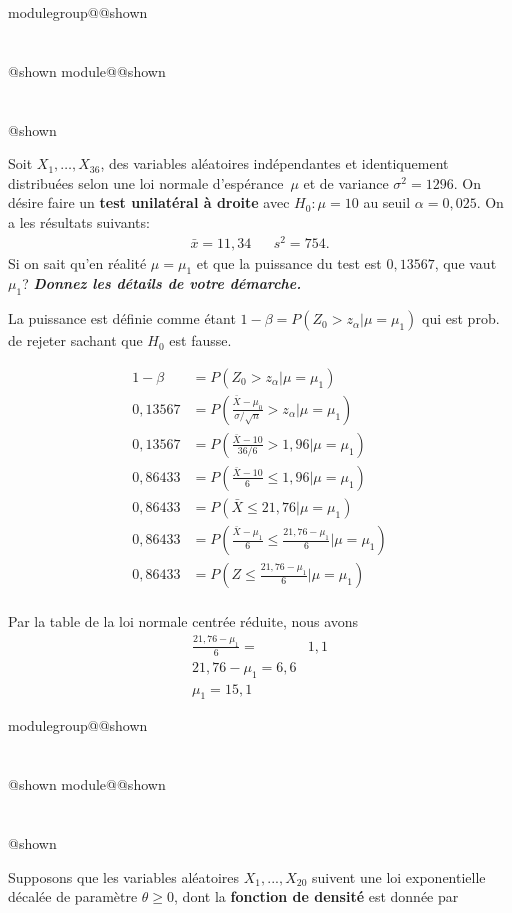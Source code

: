 \documentclass{Evaluation}
\makeatletter
\newcommand{\currentmodulekey}{}
\newcommand{\currentmoduletitle}{}
\newcommand{\currentgroupkey}{}
\newcommand{\currentgrouptitle}{}
\newcommand{\showmoduleifneeded}{%
  \ifx\currentgroupkey\empty\else
    \expandafter\ifx\csname modulegroup@\currentgroupkey @shown\endcsname\relax
      \section*{\currentgrouptitle}%
      \expandafter\gdef\csname modulegroup@\currentgroupkey @shown\endcsname{1}%
    \fi
  \fi
  \expandafter\ifx\csname module@\currentmodulekey @shown\endcsname\relax
    \section*{\currentmoduletitle}%
    \expandafter\gdef\csname module@\currentmodulekey @shown\endcsname{1}%
  \fi
}
\newenvironment{H23}{\showmoduleifneeded}{}
\makeatother
\begin{document}
\begin{questions}
\begin{H23}
\question {} %
Soit $X_1,\hdots, X_{36}$, des variables aléatoires indépendantes et identiquement distribuées selon une loi normale d'espérance~$\mu$ et de variance $\sigma^2=1296$.
On désire faire un \textbf{test unilatéral à droite} avec $H_0:\mu=10$ au seuil $\alpha = 0,025$.
On a les résultats suivants:
\begin{align*}
    \bar{x}= 11,34 &  & s^2=754.
\end{align*}
Si on sait qu'en réalité $\mu=\mu_1$ et que la puissance du test est $0,13567$, que vaut $\mu_1$? \textbf{\textit{Donnez les détails de votre démarche.}}

\begin{solution}
    La puissance est définie comme étant $1-\beta=P(Z_0>z_{\alpha}|\mu=\mu_1)$ qui est prob. de rejeter sachant que $H_0$ est fausse.

    \begin{align*}
        1-\beta &= P(Z_0>z_{\alpha}|\mu=\mu_1)\\
        0,13567&= P\left(\frac{\bar{X}-\mu_0}{\sigma/\sqrt{n}}>z_{\alpha}|\mu=\mu_1\right)\\
        0,13567&= P\left(\frac{\bar{X}-10}{36/6}>1,96|\mu=\mu_1\right)\\
        0,86433&= P\left(\frac{\bar{X}-10}{6}\leq1,96|\mu=\mu_1\right)\\
        0,86433&= P\left(\bar{X}\leq21,76|\mu=\mu_1\right)\\
        0,86433&=P\left(\frac{\bar{X}-\mu_1}{6}\leq\frac{21,76-\mu_1}{6}|\mu=\mu_1\right)\\
        0,86433&=P\left(Z\leq\frac{21,76-\mu_1}{6}|\mu=\mu_1\right)\\
    \end{align*}

Par la table de la loi normale centrée réduite, nous avons
\begin{align*}
    \frac{21,76-\mu_1}{6}=&1,1\\
    21,76-\mu_1=6,6\\
    \mu_1 =15,1
\end{align*}
\end{solution}
\end{H23}

\begin{H23}
\question {} %
Supposons que les variables aléatoires $X_1,...,X_{20}$ suivent une loi exponentielle décalée de paramètre $\theta \geq0 $, dont la \textbf{fonction de densité} est donnée par


\end{H23}
\end{questions}
\end{document}
